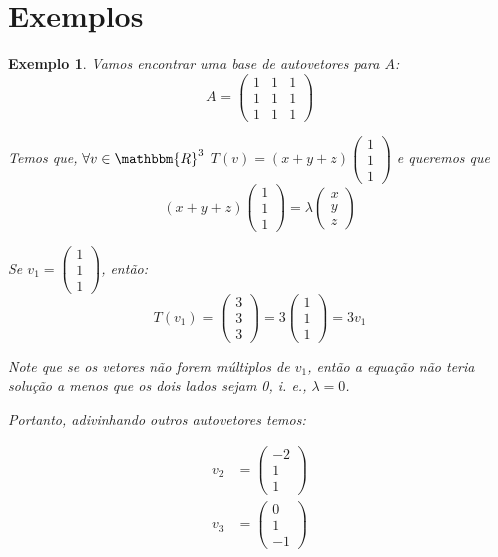 \documentclass{article}
\newcommand{\REAL} {\mathbbm{R}}
\newtheorem{example}{Exemplo}[section]
\begin{document}
    \section{Exemplos}
        \begin{example}
            Vamos encontrar uma base de autovetores para $A$:
            \[
                A  = \begin{pmatrix}
                        1&1&1\\
                        1&1&1\\
                        1&1&1
                     \end{pmatrix}
            \]

            Temos que, $\forall v \in \REAL^3$ $T(v) = (x + y + z) \begin{pmatrix}1\\1\\1\end{pmatrix}$ e queremos que
            \[
                (x + y + z) \begin{pmatrix}1\\1\\1\end{pmatrix} = \lambda \begin{pmatrix}x\\y\\z\end{pmatrix}
            \]

            Se $v_1 = \begin{pmatrix}1\\1\\1\end{pmatrix}$, então:
            \[
                T(v_1) = \begin{pmatrix}3\\3\\3\end{pmatrix} = 3 \begin{pmatrix}1\\1\\1\end{pmatrix} = 3 v_1
            \]

            Note que se os vetores não forem múltiplos de $v_1$, então a equação não teria solução a menos que os dois lados
            sejam 0, i. e., $\lambda = 0$.

            Portanto, adivinhando outros autovetores temos:

            \begin{align*}
                v_2 &= \begin{pmatrix}-2\\1\\1\end{pmatrix}\\
                v_3 &= \begin{pmatrix}0\\1\\-1\end{pmatrix}
            \end{align*}


\end{example}
\end{document}
